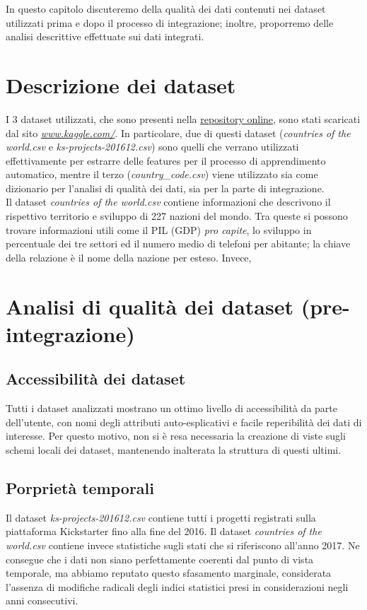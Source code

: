 In questo capitolo discuteremo della qualità dei dati contenuti nei dataset utilizzati prima e dopo il processo di integrazione; inoltre, proporremo delle analisi descrittive effettuate sui dati integrati. 
\section{Descrizione dei dataset}
I 3 dataset utilizzati, che sono presenti nella \href{https://gitlab.com/Daniele-Papetti/kickstarterprediction}{repository online}, sono stati scaricati dal sito \href{https://www.kaggle.com/}{\emph{www.kaggle.com/}}.
In particolare, due di questi dataset (\textit{countries of the world.csv} e \textit{ks-projects-201612.csv}) sono quelli che verrano utilizzati effettivamente per estrarre delle features per il processo di apprendimento automatico, mentre il terzo (\textit{country\_code.csv}) viene utilizzato sia come dizionario per l'analisi di qualità dei dati, sia per la parte di integrazione.\\
Il dataset \textit{countries of the world.csv} contiene informazioni che descrivono il rispettivo territorio e sviluppo di 227 nazioni del mondo.
Tra queste si possono trovare informazioni utili come il PIL (GDP) \textit{pro capite}, lo sviluppo in percentuale dei tre settori ed il numero medio di telefoni per abitante; la chiave della relazione è il nome della nazione per esteso.
Invece, 

\section{Analisi di qualità dei dataset (pre-integrazione)}

\subsection{Accessibilità dei dataset}
Tutti i dataset analizzati mostrano un ottimo livello di accessibilità da parte dell'utente, con nomi degli attributi auto-esplicativi e facile reperibilità dei dati di interesse. Per questo motivo, non si è resa necessaria la creazione di viste sugli schemi locali dei dataset, mantenendo inalterata la struttura di questi ultimi.

\subsection{Porprietà temporali}
Il dataset \textit{ks-projects-201612.csv} contiene tutti i progetti registrati sulla piattaforma Kickstarter fino alla fine del 2016. Il dataset \textit{countries of the world.csv} contiene invece statistiche sugli stati che si riferiscono all'anno 2017. Ne consegue che i dati non siano perfettamente coerenti dal punto di vista temporale, ma abbiamo reputato questo sfasamento marginale, considerata l'assenza di modifiche radicali degli indici statistici presi in considerazioni negli anni consecutivi.

